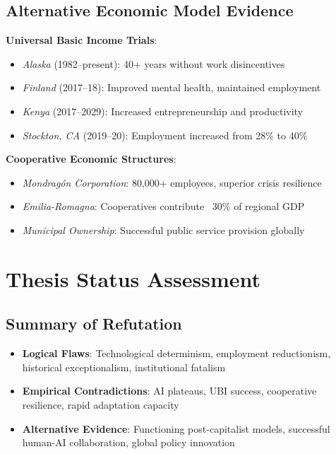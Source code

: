 \documentclass[11pt,a4paper]{article}
\newcommand{\emphasis}[1]{\textbf{\textcolor{primaryblue}{#1}}}
\begin{document}
\subsection{Alternative Economic Model Evidence}

\textbf{Universal Basic Income Trials}:
\begin{itemize}[leftmargin=*]
\item \textit{Alaska} (1982--present): 40+ years without work disincentives
\item \textit{Finland} (2017--18): Improved mental health, maintained employment
\item \textit{Kenya} (2017--2029): Increased entrepreneurship and productivity
\item \textit{Stockton, CA} (2019--20): Employment increased from 28\% to 40\%
\end{itemize}

\textbf{Cooperative Economic Structures}:
\begin{itemize}[leftmargin=*]
\item \textit{Mondragón Corporation}: 80,000+ employees, superior crisis resilience
\item \textit{Emilia-Romagna}: Cooperatives contribute ~30\% of regional GDP
\item \textit{Municipal Ownership}: Successful public service provision globally
\end{itemize}

\section{Thesis Status Assessment}

\begin{center}
\end{center}

\subsection{Summary of Refutation}

\begin{itemize}[leftmargin=*]
\item \emphasis{Logical Flaws}: Technological determinism, employment reductionism, historical exceptionalism, institutional fatalism
\item \emphasis{Empirical Contradictions}: AI plateaus, UBI success, cooperative resilience, rapid adaptation capacity  
\item \emphasis{Alternative Evidence}: Functioning post-capitalist models, successful human-AI collaboration, global policy innovation
\end{itemize}
\end{document}
